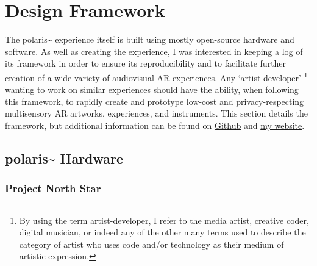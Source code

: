 


\section{Design Framework}\label{sec: polaris-framework}
The polaris\textasciitilde{} experience itself is built using mostly open-source hardware and software. As well as creating the experience, I was interested in keeping a log of its framework in order to ensure its reproducibility and to facilitate further creation of a wide variety of audiovisual AR experiences. Any ‘artist-developer’ \footnote{By using the term artist-developer, I refer to the media artist, creative coder, digital musician, or indeed any of the other many terms used to describe the category of artist who uses code and/or technology as their medium of artistic expression.} wanting to work on similar experiences should have the ability, when following this framework, to rapidly create and prototype low-cost and privacy-respecting multisensory AR artworks, experiences, and instruments. This section details the framework, but additional information can be found on \href{https://github.com/sambilbow/polaris}{Github} and \href{https://sambilbow.com}{my website}.

\subsection{polaris\textasciitilde{} Hardware}\label{sec: polaris-framework-hardware}
\subsubsection{Project North Star}\label{sec: polaris-framework-hardware-pns}

